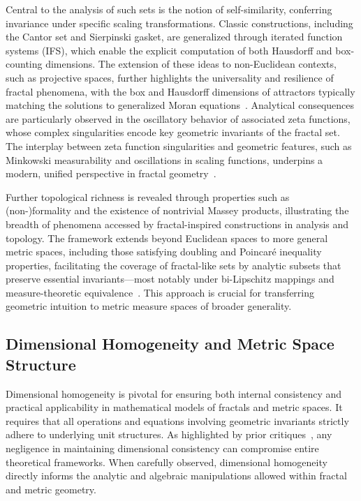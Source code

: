 Central to the analysis of such sets is the notion of self-similarity, conferring invariance under specific scaling transformations. Classic constructions, including the Cantor set and Sierpinski gasket, are generalized through iterated function systems (IFS), which enable the explicit computation of both Hausdorff and box-counting dimensions. The extension of these ideas to non-Euclidean contexts, such as projective spaces, further highlights the universality and resilience of fractal phenomena, with the box and Hausdorff dimensions of attractors typically matching the solutions to generalized Moran equations~\cite{ref24,ref33}. Analytical consequences are particularly observed in the oscillatory behavior of associated zeta functions, whose complex singularities encode key geometric invariants of the fractal set. The interplay between zeta function singularities and geometric features, such as Minkowski measurability and oscillations in scaling functions, underpins a modern, unified perspective in fractal geometry~\cite{ref21,ref23,ref33}.

Further topological richness is revealed through properties such as (non-)formality and the existence of nontrivial Massey products, illustrating the breadth of phenomena accessed by fractal-inspired constructions in analysis and topology. The framework extends beyond Euclidean spaces to more general metric spaces, including those satisfying doubling and Poincaré inequality properties, facilitating the coverage of fractal-like sets by analytic subsets that preserve essential invariants—most notably under bi-Lipschitz mappings and measure-theoretic equivalence~\cite{ref23,ref93,ref6}. This approach is crucial for transferring geometric intuition to metric measure spaces of broader generality.

\subsection{Dimensional Homogeneity and Metric Space Structure}

Dimensional homogeneity is pivotal for ensuring both internal consistency and practical applicability in mathematical models of fractals and metric spaces. It requires that all operations and equations involving geometric invariants strictly adhere to underlying unit structures. As highlighted by prior critiques~\cite{ref61}, any negligence in maintaining dimensional consistency can compromise entire theoretical frameworks. When carefully observed, dimensional homogeneity directly informs the analytic and algebraic manipulations allowed within fractal and metric geometry.

